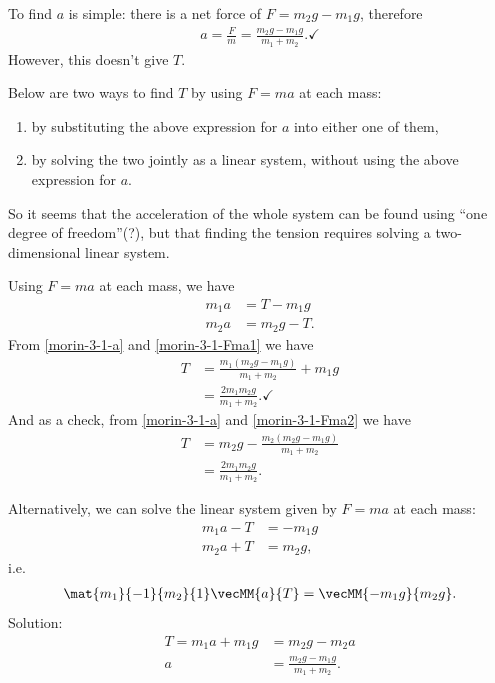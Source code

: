 To find $a$ is simple: there is a net force of $F = m_2g - m_1g$, therefore
\begin{align}
  a = \frac{F}{m} = \frac{m_2g - m_1g}{m_1 + m_2}. \label{morin-3-1-a} \checkmark
\end{align}
However, this doesn't give $T$.

Below are two ways to find $T$ by using $F = ma$ at each mass:
\begin{enumerate}
\item by substituting the above expression for $a$ into either one of them,
\item by solving the two jointly as a linear system, without using the above expression for $a$.
\end{enumerate}

So it seems that the acceleration of the whole system can be found using ``one degree of
freedom''(?), but that finding the tension requires solving a two-dimensional linear system.

Using $F = ma$ at each mass, we have
\begin{align}
  m_1a &= T-m_1g   \label{morin-3-1-Fma1}\\
  m_2a &= m_2g - T \label{morin-3-1-Fma2}.
\end{align}
From \eqref{morin-3-1-a} and \eqref{morin-3-1-Fma1} we have
\begin{align*}
  T &= \frac{m_1(m_2g - m_1g)}{m_1 + m_2} + m_1g \\
    &= \frac{2m_1m_2g}{m_1 + m_2}. \checkmark
\end{align*}
And as a check, from \eqref{morin-3-1-a} and \eqref{morin-3-1-Fma2} we have
\begin{align*}
  T &= m_2g - \frac{m_2(m_2g - m_1g)}{m_1 + m_2} \\
    &= \frac{2m_1m_2g}{m_1 + m_2}.
\end{align*}

Alternatively, we can solve the linear system given by $F = ma$ at each mass:
\begin{align*}
  m_1a - T &= -m_1g \\
  m_2a + T &= m_2g,
\end{align*}
i.e.
\begin{align*}
  \mat{m_1}{-1}
      {m_2}{1} \vecMM{a}{T} = \vecMM{-m_1g}{m_2g}.
\end{align*}
Solution:
\begin{align*}
    T = m_1a + m_1g &= m_2g - m_2a \\
    a &= \frac{m_2g - m_1g}{m_1 + m_2}.
\end{align*}
